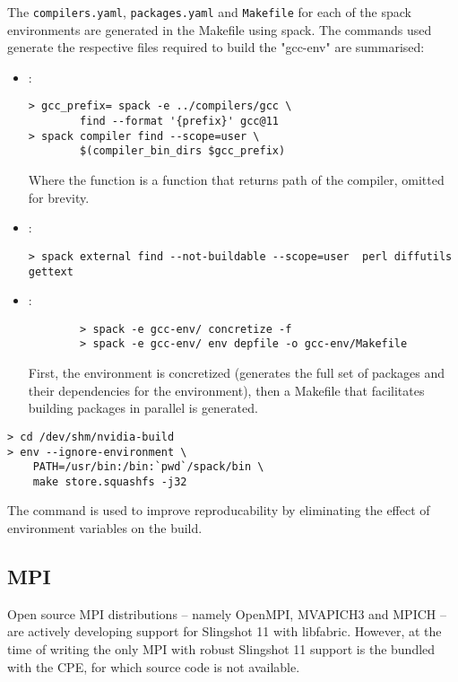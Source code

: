 The \lstinline{compilers.yaml}, \lstinline{packages.yaml} and \lstinline{Makefile} for each of the spack environments are generated in the Makefile using spack. The commands used generate the respective files required to build the "gcc-env" are summarised:
\begin{itemize}
    \item {}:
        \begin{lstlisting}
> gcc_prefix= spack -e ../compilers/gcc \
        find --format '{prefix}' gcc@11
> spack compiler find --scope=user \
        $(compiler_bin_dirs $gcc_prefix)
        \end{lstlisting}
        Where the function  is a function that returns  path of the compiler, omitted for brevity.

    \item \lst{gcc-env/packages.yaml}:
        \begin{lstlisting}
> spack external find --not-buildable --scope=user  perl diffutils gettext
        \end{lstlisting}

    \item {}:
        \begin{lstlisting}
        > spack -e gcc-env/ concretize -f
        > spack -e gcc-env/ env depfile -o gcc-env/Makefile
        \end{lstlisting}
        First, the environment is concretized (\spack generates the full set of packages and their dependencies for the environment), then a Makefile that facilitates building packages in parallel is generated.
\end{itemize}

\begin{lstlisting}
> cd /dev/shm/nvidia-build
> env --ignore-environment \
    PATH=/usr/bin:/bin:`pwd`/spack/bin \
    make store.squashfs -j32
\end{lstlisting}
The \lst{env} command is used to improve reproducability by eliminating the effect of environment variables on the build.

\subsection{MPI}
Open source MPI distributions -- namely OpenMPI, MVAPICH3 and MPICH -- are actively developing support for Slingshot 11 with libfabric.
However, at the time of writing the only MPI with robust Slingshot 11 support is the \craympich bundled with the CPE, for which source code is not available.

